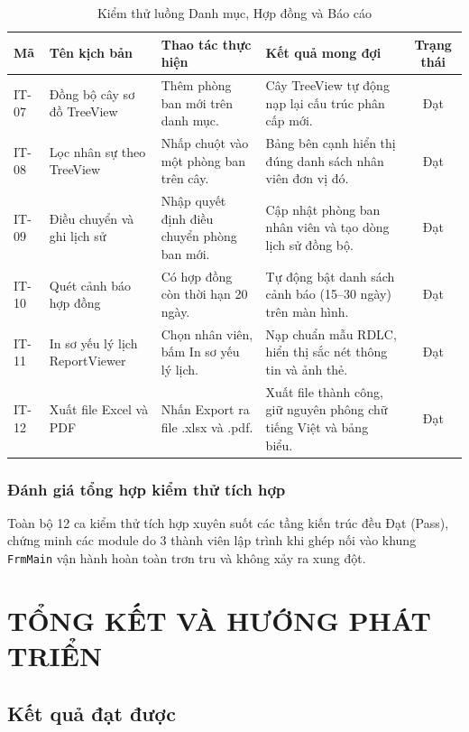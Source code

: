\documentclass[12pt,a4paper]{report}
\begin{document}
\begin{table}[htbp]
\centering
\small
\begin{tabularx}{\textwidth}{|l|p{3.5cm}|p{3.8cm}|p{3.8cm}|c|}
\hline
\textbf{Mã} & \textbf{Tên kịch bản} & \textbf{Thao tác thực hiện} & \textbf{Kết quả mong đợi} & \textbf{Trạng thái} \\ \hline
IT-07 & Đồng bộ cây sơ đồ TreeView & Thêm phòng ban mới trên danh mục. & Cây TreeView tự động nạp lại cấu trúc phân cấp mới. & Đạt \\ \hline
IT-08 & Lọc nhân sự theo TreeView & Nhấp chuột vào một phòng ban trên cây. & Bảng bên cạnh hiển thị đúng danh sách nhân viên đơn vị đó. & Đạt \\ \hline
IT-09 & Điều chuyển và ghi lịch sử & Nhập quyết định điều chuyển phòng ban mới. & Cập nhật phòng ban nhân viên và tạo dòng lịch sử đồng bộ. & Đạt \\ \hline
IT-10 & Quét cảnh báo hợp đồng & Có hợp đồng còn thời hạn 20 ngày. & Tự động bật danh sách cảnh báo (15--30 ngày) trên màn hình. & Đạt \\ \hline
IT-11 & In sơ yếu lý lịch ReportViewer & Chọn nhân viên, bấm In sơ yếu lý lịch. & Nạp chuẩn mẫu RDLC, hiển thị sắc nét thông tin và ảnh thẻ. & Đạt \\ \hline
IT-12 & Xuất file Excel và PDF & Nhấn Export ra file .xlsx và .pdf. & Xuất file thành công, giữ nguyên phông chữ tiếng Việt và bảng biểu. & Đạt \\ \hline
\end{tabularx}
\caption{Kiểm thử luồng Danh mục, Hợp đồng và Báo cáo}
\end{table}

\subsection*{Đánh giá tổng hợp kiểm thử tích hợp}
Toàn bộ 12 ca kiểm thử tích hợp xuyên suốt các tầng kiến trúc đều Đạt (Pass), chứng minh các module do 3 thành viên lập trình khi ghép nối vào khung \texttt{FrmMain} vận hành hoàn toàn trơn tru và không xảy ra xung đột.

\chapter{TỔNG KẾT VÀ HƯỚNG PHÁT TRIỂN}

\section{Kết quả đạt được}
\end{document}
